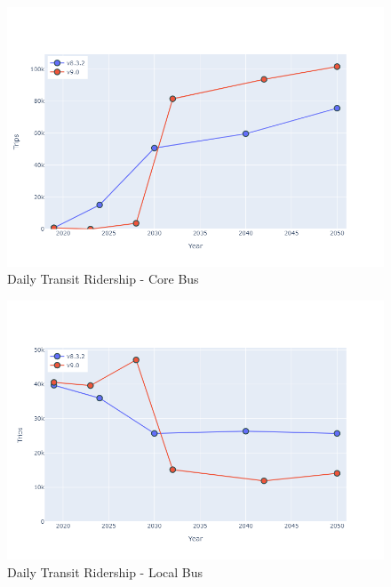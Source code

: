 \documentclass[
  letterpaper,
  DIV=11,
  numbers=noendperiod,
  titlepage=false]{scrreprt}
\begin{document}
\begin{figure}[H]

{\centering \includegraphics{v9x/v900/whats-new/_pictures/pdf-hy-tr-cor.png}

}

\caption{\label{fig-hy-tr-cor}Daily Transit Ridership - Core Bus}

\end{figure}

\begin{figure}[H]

{\centering \includegraphics{v9x/v900/whats-new/_pictures/pdf-hy-tr-lcl.png}

}

\caption{\label{fig-pdf-hy-tr-lcl}Daily Transit Ridership - Local Bus}

\end{figure}
\end{document}
